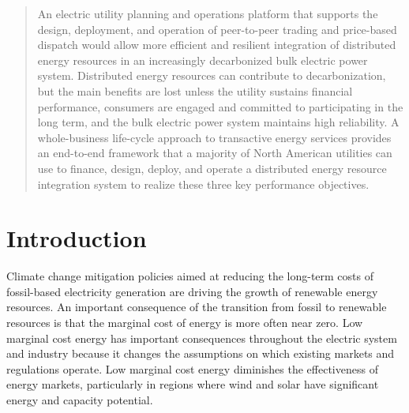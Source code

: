 \documentclass[10pt,twocolumn]{article}
\begin{document}
\maketitle

\begin{abstract}

    An electric utility planning and operations platform that supports the design, deployment, and operation of peer-to-peer trading and price-based dispatch would allow more efficient and resilient integration of distributed energy resources in an increasingly decarbonized bulk electric power system. Distributed energy resources can contribute to decarbonization, but the main benefits are lost unless the utility sustains financial performance, consumers are engaged and committed to participating in the long term, and the bulk electric power system maintains high reliability. A whole-business life-cycle approach to transactive energy services provides an end-to-end framework that a majority of North American utilities can use to finance, design, deploy, and operate a distributed energy resource integration system to realize these three key performance objectives.
    
\end{abstract}

\section{Introduction}

Climate change mitigation policies aimed at reducing the long-term costs of fossil-based electricity generation are driving the growth of renewable energy resources. An important consequence of the transition from fossil to renewable resources is that the marginal cost of energy is more often near zero. Low marginal cost energy has important consequences throughout the electric system and industry because it changes the assumptions on which existing markets and regulations operate. Low marginal cost energy diminishes the effectiveness of energy markets, particularly in regions where wind and solar have significant energy and capacity potential. 
\end{document}
